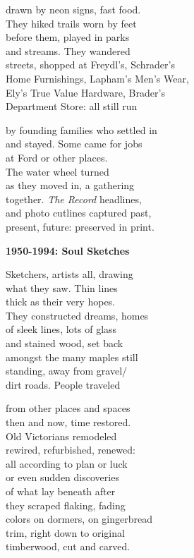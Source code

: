 \documentclass[twoside,10pt]{book}
\begin{document}
drawn by neon signs, fast food.\\
They hiked trails worn by feet\\
before them, played in parks\\
and streams. They wandered\\
streets, shopped at Freydl's, Schrader's\\
Home Furnishings, Lapham's Men's Wear,\\
Ely's True Value Hardware, Brader's\\
Department Store: all still run

by founding families who settled in\\
and stayed. Some came for jobs\\
at Ford or other places.\\
The water wheel turned\\
as they moved in, a gathering\\
together. \emph{The Record} headlines,\\
and photo cutlines captured past,\\
present, future: preserved in print.

{\bf 1950-1994: Soul Sketches}

Sketchers, artists all, drawing\\
what they saw. Thin lines\\
thick as their very hopes.\\
They constructed dreams, homes\\
of sleek lines, lots of glass\\
and stained wood, set back\\
amongst the many maples still\\
standing, away from gravel/\\
dirt roads. People traveled

from other places and spaces\\
then and now, time restored.\\
Old Victorians remodeled\\
rewired, refurbished, renewed:\\
all according to plan or luck\\
or even sudden discoveries\\
of what lay beneath after\\
they scraped flaking, fading\\
colors on dormers, on gingerbread\\
trim, right down to original\\
timberwood, cut and carved.
\end{document}
